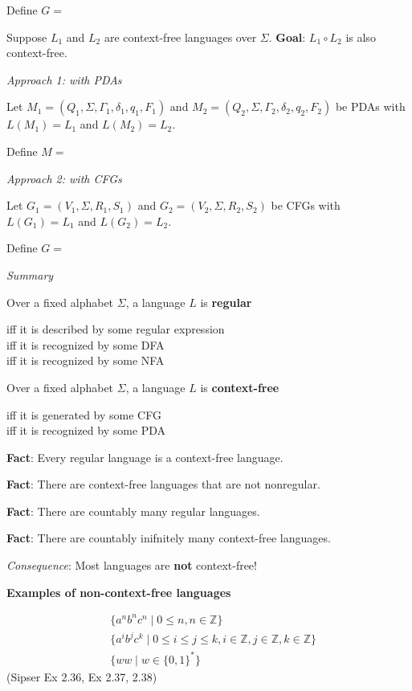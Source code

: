 \documentclass[12pt, oneside]{article}
\begin{document}
Define $G = $

\vfill

\newpage
Suppose $L_1$ and $L_2$ are context-free languages over $\Sigma$.  {\bf Goal}:  $L_1 \circ L_2$  is  also context-free.


{\it Approach 1: with  PDAs}

Let $M_1 = ( Q_1, \Sigma, \Gamma_1, \delta_1, q_1, F_1)$ and
$M_2 = ( Q_2, \Sigma, \Gamma_2, \delta_2, q_2, F_2)$ be PDAs with 
$L(M_1) =  L_1$  and  $L(M_2) = L_2$.

Define $M = $

\vfill

{\it Approach  2: with CFGs}

Let $G_1 = (V_1, \Sigma, R_1, S_1)$  and   $G_2 = (V_2, \Sigma, R_2, S_2)$  be CFGs  with
$L(G_1) =  L_1$  and  $L(G_2) = L_2$.

Define $G = $

\vfill
\newpage
{\it Summary}

Over a fixed alphabet $\Sigma$, a language $L$ is {\bf regular}

\vspace{-20pt}
\begin{center}
    iff it is described by some regular expression \\
    iff it is recognized by some DFA\\
    iff it is recognized by some NFA
\end{center}

Over a fixed alphabet $\Sigma$, a language $L$ is {\bf context-free}

\vspace{-20pt}
\begin{center}
    iff it is generated by some CFG\\
    iff it is recognized by some PDA
\end{center}

{\bf Fact}: Every regular language is a context-free language.

{\bf Fact}: There are context-free languages that are not nonregular.

{\bf Fact}: There are countably many regular languages.

{\bf Fact}: There are countably inifnitely many context-free languages.

{\it Consequence}: Most languages are {\bf not} context-free!

{\bf Examples  of non-context-free languages}

\begin{align*}
    &\{ a^n b^n c^n \mid 0 \leq n , n \in \mathbb{Z}\}\\
    &\{ a^i b^j c^k \mid 0 \leq i \leq j \leq k , i \in \mathbb{Z}, j \in \mathbb{Z}, k \in \mathbb{Z}\}\\
    &\{ ww \mid w \in \{0,1\}^* \}
\end{align*}
(Sipser Ex 2.36, Ex 2.37, 2.38)
\end{document}
